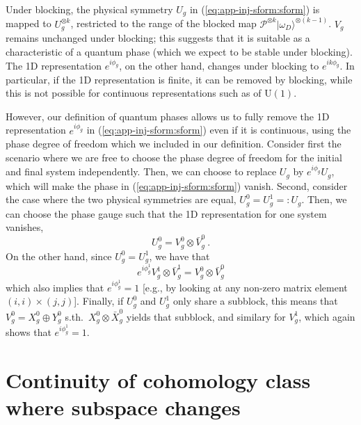 \documentclass[twocolumn,superscriptaddress,prb,linenumbers]{revtex4-1}
\newcommand{\ket}[1]{\vert#1\rangle}
\newcommand{\mc}[1]{\mathcal{#1}}
\begin{document}
Under blocking, the physical symmetry $U_g$ in (\ref{eq:app-inj-sform:sform})
is mapped to $U_g^{\otimes k}$, restricted to the
range of the blocked map $\mc P^{\otimes k}\ket{\omega_D}^{\otimes (k-1)}$.
$V_g$ remains unchanged under blocking;
this suggests that it is suitable as a characteristic of a quantum
phase (which we expect to be stable under blocking).  The 1D
representation $e^{i\phi_g}$, on the other hand, changes under blocking to
$e^{ik\phi_g}$. In particular, if the 1D representation is finite, it can
be removed by blocking, while this is not possible for continuous
representations such as of $\mathrm{U}(1)$.

However, our definition of quantum phases allows us to fully remove the
1D representation $e^{i\phi_g}$ in (\ref{eq:app-inj-sform:sform}) even if
it is continuous, using
the phase degree of freedom which we included in our definition. Consider
first the scenario where we are free to choose the phase degree of freedom
for the initial and final system independently. Then, we can choose to
replace $U_g$ by $e^{i\phi_g}U_g$, which will make the phase in
(\ref{eq:app-inj-sform:sform}) vanish. Second, consider the case where the
two physical symmetries are equal, $U_g^0=U_g^1=:U_g$. Then, we can choose
the phase gauge such that the 1D representation for one system vanishes,
\[
    U_g^0=V^0_g\otimes \bar V_g^0\ .
\]
On the other hand, since $U_g^0=U_g^1$, we have that
\[
    e^{i\phi_g^1}V^1_g\otimes \bar V_g^1
    = V_g^0\otimes \bar V_g^0
\]
which also implies that $e^{i\phi_g^1}=1$ [e.g., by looking at any
        non-zero matrix element $(i,i)\times(j,j)$]. Finally, if $U_g^0$ and
$U_g^1$ only share a subblock, this means that $V_g^0=X_g^0\oplus Y_g^0$
s.th.\ $X_g^0\otimes\bar X_g^0$ yields that subblock, and similary for
$V_g^1$, which again shows that $e^{i\phi_g^1}=1$.





\section{Continuity of cohomology class where subspace changes
  \label{app:coh-class-cont-dimchange}}
\end{document}
